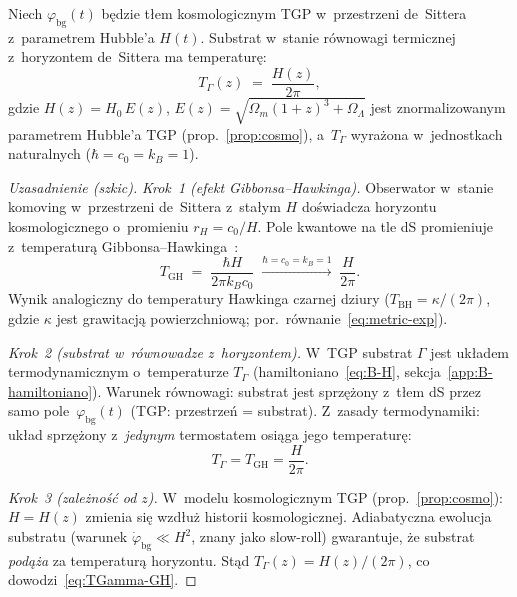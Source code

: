 \begin{proposition}[$T_\Gamma(z) = H(z)/(2\pi)$:
  temperatura Gibbonsa--Hawkinga substratu]%
\label{prop:TGamma-from-Unruh}
Niech $\varphi_{\mathrm{bg}}(t)$ b\k{e}dzie t\l{}em kosmologicznym TGP
w~przestrzeni de~Sittera z~parametrem Hubble'a $H(t)$.
Substrat w~stanie r\'ownowagi termicznej
z~horyzontem de~Sittera ma temperatur\k{e}:
\begin{equation}\label{eq:TGamma-GH}
  \boxed{
    T_\Gamma(z) \;=\; \frac{H(z)}{2\pi},
  }
\end{equation}
gdzie $H(z) = H_0\,E(z)$,
$E(z) = \sqrt{\Omega_m(1+z)^3 + \Omega_\Lambda}$
jest znormalizowanym parametrem Hubble'a TGP
(prop.~\ref{prop:cosmo}), a~$T_\Gamma$ wyra\.zona
w~jednostkach naturalnych ($\hbar = c_0 = k_B = 1$).
\end{proposition}

\begin{proof}[Uzasadnienie (szkic)]
\emph{Krok~1 (efekt Gibbonsa--Hawkinga).}
Obserwator w~stanie komoving w~przestrzeni de~Sittera
z~sta\l{}ym $H$ do\'swiadcza horyzontu kosmologicznego
o~promieniu $r_H = c_0/H$.
Pole kwantowe na tle dS promieniuje z~temperatur\k{a}
Gibbonsa--Hawkinga~\cite{Gibbons-Hawking-1977}:
\begin{equation}\label{eq:T-GH}
  T_{\mathrm{GH}} \;=\; \frac{\hbar H}{2\pi k_B c_0}
  \;\xrightarrow{\hbar=c_0=k_B=1}\;
  \frac{H}{2\pi}.
\end{equation}
Wynik analogiczny do temperatury Hawkinga czarnej dziury
($T_{\mathrm{BH}} = \kappa/(2\pi)$, gdzie $\kappa$ jest
grawitacj\k{a} powierzchniow\k{a}; por.\ r\'ownanie~\eqref{eq:metric-exp}).

\emph{Krok~2 (substrat w~r\'ownowadze z~horyzontem).}
W~TGP substrat $\Gamma$ jest uk\l{}adem termodynamicznym
o~temperaturze $T_\Gamma$
(hamiltoniano~\eqref{eq:B-H}, sekcja~\ref{app:B-hamiltoniano}).
Warunek r\'ownowagi:
substrat jest sprzężony z~t\l{}em dS przez samo pole~$\varphi_{\mathrm{bg}}(t)$
(TGP: przestrze\'n = substrat).
Z~zasady termodynamiki: uk\l{}ad sprzężony z~\emph{jedynym}
termostatem osi\k{a}ga jego temperatur\k{e}:
\begin{equation}\label{eq:eq-condition}
  T_\Gamma = T_{\mathrm{GH}} = \frac{H}{2\pi}.
\end{equation}

\emph{Krok~3 (zale\.zno\'s\'c od $z$).}
W~modelu kosmologicznym TGP (prop.~\ref{prop:cosmo}):
$H = H(z)$ zmienia si\k{e} wzd\l{}u\.z historii kosmologicznej.
Adiabatyczna ewolucja substratu (warunek $\dot\varphi_{\mathrm{bg}} \ll H^2$,
znany jako slow-roll) gwarantuje,
\.ze substrat \emph{pod\k{a}\.za} za temperatur\k{a} horyzontu.
St\k{a}d $T_\Gamma(z) = H(z)/(2\pi)$, co dowodzi~\eqref{eq:TGamma-GH}.
\end{proof}

